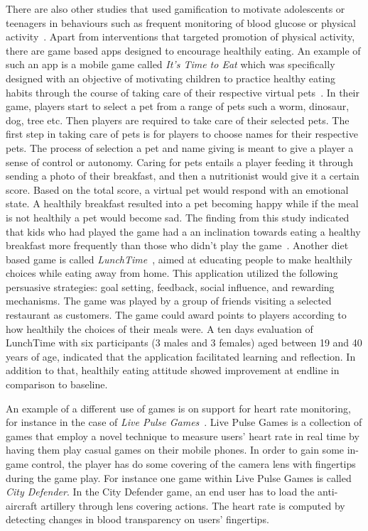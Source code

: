 There are also other studies that used gamification to motivate adolescents or teenagers in behaviours such as frequent monitoring of blood glucose or physical activity~\citep{arteaga2010:persuasive,cafazzo2012:bant}. Apart from interventions that targeted promotion of physical activity, there are game based apps designed to encourage healthily eating. An example of such an app is a mobile game called \emph{It's Time to Eat} which was specifically designed with an objective of  motivating children to practice healthy eating habits through the course of taking care of their respective virtual pets~\citep{pollak2010s}. In their game, players start to select a pet from a range of pets such a worm, dinosaur, dog, tree etc. Then players are required to take care of their selected pets. The first step in taking care of pets  is for players to choose names for their respective pets. The process of selection a pet and name giving is meant to give a player a sense of control or autonomy. Caring for pets entails a player feeding it through sending a photo of their breakfast, and then a nutritionist would give it a certain score. Based on the total score, a virtual pet would respond with an emotional state. A healthily breakfast resulted into a pet becoming happy while if the meal is not healthily a pet would become sad. The finding from this study indicated that kids who had played the game had a an inclination towards eating a healthy breakfast more frequently than those who didn't play the game~\citep{pollak2010s}. Another diet based game is called \emph{LunchTime}~\citep{orji2013lunchtime}, aimed at educating people to make healthily choices while eating away from home. This application utilized the following persuasive strategies: goal setting, feedback, social influence, and rewarding mechanisms. The game was played by a group of friends visiting a selected restaurant as customers. The game could award points to players according to how healthily the choices of their meals were. A ten days evaluation  of LunchTime with six participants (3 males and 3 females) aged between 19 and 40 years of age, indicated that the application facilitated learning and reflection. In addition to that, healthily eating attitude showed improvement at endline in comparison to baseline. 

An example  of a different use of games is on support for heart rate monitoring, for instance in the case of \emph{Live Pulse Games}~\citep{han2014designing,han2015balancing}. Live Pulse Games is a collection of games that employ a novel technique to measure users' heart rate in real time by having them play casual games on their mobile phones. In order to gain some in-game control, the player has do some covering of the camera lens with fingertips during the game play. For instance one game within Live Pulse Games is called \emph{City Defender}. In the City Defender game, an end user has to load the anti-aircraft artillery through lens covering actions. The heart rate is computed by detecting changes  in  blood transparency on users’ fingertips.
 
